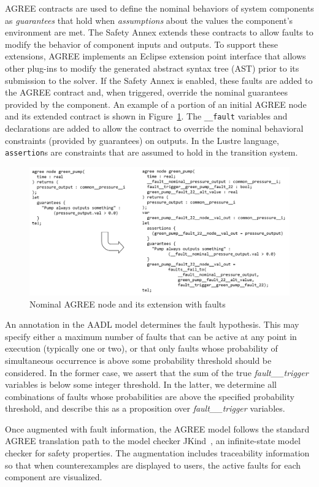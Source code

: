 AGREE contracts are used to define the nominal behaviors of system components as {\em guarantees} that hold when {\em assumptions} about the values the component's environment are met.  The Safety Annex extends these contracts to allow faults to modify the behavior of component inputs and outputs.  To support these extensions, AGREE implements an Eclipse extension point interface that allows other plug-ins to modify the generated abstract syntax tree (AST) prior to its submission to the solver.  If the Safety Annex is enabled, these faults are added to the AGREE contract and, when triggered, override the nominal guarantees provided by the component.  An example of a portion of an initial AGREE node and its extended contract is shown in Figure~\ref{fig:comp}.  The \texttt{\_\_fault} variables and declarations are added to allow the contract to override the nominal behavioral constraints (provided by guarantees) on outputs.  In the Lustre language, \texttt{assertion}s are constraints that are assumed to hold in the transition system.

\begin{figure}
\vspace{-0.1in}
\includegraphics[width=\textwidth]{images/sample_code.png}
\vspace{-0.3in}
\caption{Nominal AGREE node and its extension with faults}
\label{fig:comp}
\end{figure}

An annotation in the AADL model determines the fault hypothesis.  This may specify either a maximum number of faults that can be active at any point in execution (typically one or two), or that only faults whose probability of simultaneous occurrence is above some probability threshold should be considered.  In the former case, we assert that the sum of the true {\em fault\_\_trigger} variables is below some integer threshold.  In the latter, we determine all  combinations of faults whose probabilities are above the specified probability threshold, and describe this as a proposition over {\em fault\_\_trigger} variables.

Once augmented with fault information, the AGREE model follows the standard AGREE translation path to the model checker JKind~\cite{2017arXiv171201222G}, an infinite-state model checker for safety properties.  The augmentation includes traceability information so that when counterexamples are displayed to users, the active faults for each component are visualized.



